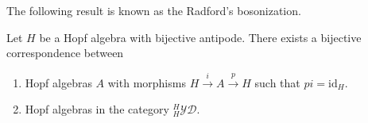 The following result is known as the Radford's bosonization. 

\begin{theorem}[Radford]
\label{theorem:bosonization}
Let $H$ be a Hopf algebra with bijective antipode. There exists a bijective
correspondence between
\begin{enumerate}
\item Hopf algebras $A$ with morphisms $H\xrightarrow{i}A\xrightarrow{p}H$
such that $pi=\textrm{id}_{H}$.
\item Hopf algebras in the category $_{H}^{H}\mathcal{YD}$.
\end{enumerate}
\end{theorem}


